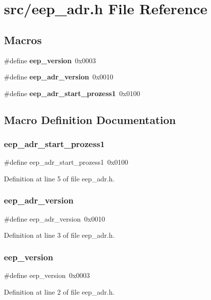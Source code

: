 \section{src/eep\+\_\+adr.h File Reference}
\label{eep__adr_8h}
\subsection*{Macros}
\begin{DoxyCompactItemize}
\item 
\#define \textbf{ eep\+\_\+version}~0x0003
\item 
\#define \textbf{ eep\+\_\+adr\+\_\+version}~0x0010
\item 
\#define \textbf{ eep\+\_\+adr\+\_\+start\+\_\+prozess1}~0x0100
\end{DoxyCompactItemize}


\subsection{Macro Definition Documentation}
\mbox{\label{eep__adr_8h_a01a0a6737faa8c3e0cc1f0a4442abbb8}} 
\subsubsection{eep\+\_\+adr\+\_\+start\+\_\+prozess1}
{\footnotesize\ttfamily \#define eep\+\_\+adr\+\_\+start\+\_\+prozess1~0x0100}



Definition at line 5 of file eep\+\_\+adr.\+h.

\mbox{\label{eep__adr_8h_a0b037b2687948102104fe47009179416}} 
\subsubsection{eep\+\_\+adr\+\_\+version}
{\footnotesize\ttfamily \#define eep\+\_\+adr\+\_\+version~0x0010}



Definition at line 3 of file eep\+\_\+adr.\+h.

\mbox{\label{eep__adr_8h_a355eed1f700ffb7c19ea4fe4591f51f2}} 
\subsubsection{eep\+\_\+version}
{\footnotesize\ttfamily \#define eep\+\_\+version~0x0003}



Definition at line 2 of file eep\+\_\+adr.\+h.

